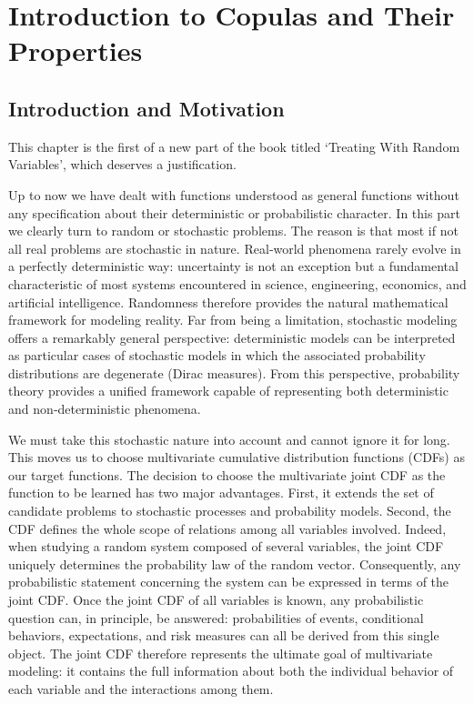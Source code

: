\startcontents[chapter]
\chapter{Introduction to Copulas and Their Properties}\label{ch:copulas}
\minitocboxed

\section*{Introduction and Motivation}\label{sec:introduction}
This chapter is the first of a new part of the book titled ‘Treating With Random Variables’, which deserves a justification.

Up to now we have dealt with functions understood as general functions without any specification about their deterministic or probabilistic character. In this part we clearly turn to random or stochastic problems. The reason is that most if not all real problems are stochastic in nature. Real‑world phenomena rarely evolve in a perfectly deterministic way: uncertainty is not an exception but a fundamental characteristic of most systems encountered in science, engineering, economics, and artificial intelligence. Randomness therefore provides the natural mathematical framework for modeling reality. Far from being a limitation, stochastic modeling offers a remarkably general perspective: deterministic models can be interpreted as particular cases of stochastic models in which the associated probability distributions are degenerate (Dirac measures). From this perspective, probability theory provides a unified framework capable of representing both deterministic and non‑deterministic phenomena.

We must take this stochastic nature into account and cannot ignore it for long. This moves us to choose multivariate cumulative distribution functions (CDFs) as our target functions. The decision to choose the multivariate joint CDF as the function to be learned has two major advantages. First, it extends the set of candidate problems to stochastic processes and probability models. Second, the CDF defines the whole scope of relations among all variables involved. Indeed, when studying a random system composed of several variables, the joint CDF uniquely determines the probability law of the random vector. Consequently, any probabilistic statement concerning the system can be expressed in terms of the joint CDF. Once the joint CDF of all variables is known, any probabilistic question can, in principle, be answered: probabilities of events, conditional behaviors, expectations, and risk measures can all be derived from this single object. The joint CDF therefore represents the ultimate goal of multivariate modeling: it contains the full information about both the individual behavior of each variable and the interactions among them.

